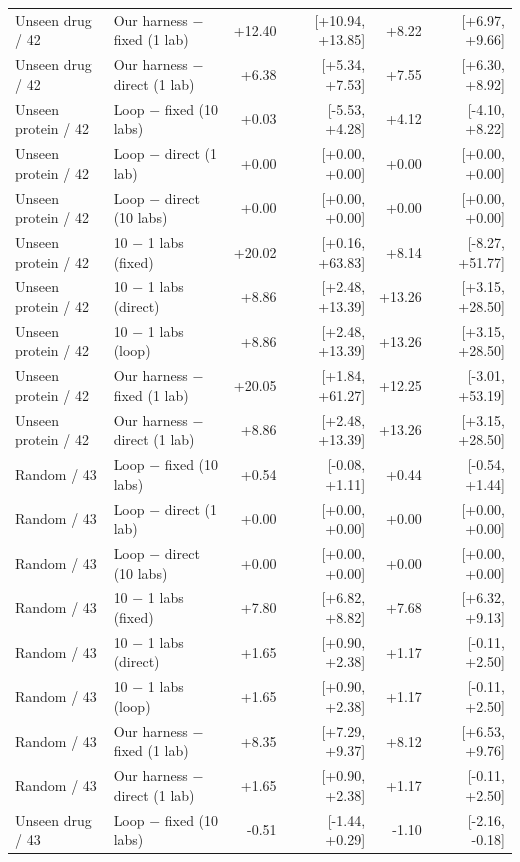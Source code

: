 \begin{longtable}{llrrrr}
Unseen drug / 42 & Our harness $-$ fixed (1 lab) & +12.40 & [+10.94, +13.85] & +8.22 & [+6.97, +9.66] \\
Unseen drug / 42 & Our harness $-$ direct (1 lab) & +6.38 & [+5.34, +7.53] & +7.55 & [+6.30, +8.92] \\
\midrule
Unseen protein / 42 & Loop $-$ fixed (10 labs) & +0.03 & [-5.53, +4.28] & +4.12 & [-4.10, +8.22] \\
Unseen protein / 42 & Loop $-$ direct (1 lab) & +0.00 & [+0.00, +0.00] & +0.00 & [+0.00, +0.00] \\
Unseen protein / 42 & Loop $-$ direct (10 labs) & +0.00 & [+0.00, +0.00] & +0.00 & [+0.00, +0.00] \\
Unseen protein / 42 & 10 $-$ 1 labs (fixed) & +20.02 & [+0.16, +63.83] & +8.14 & [-8.27, +51.77] \\
Unseen protein / 42 & 10 $-$ 1 labs (direct) & +8.86 & [+2.48, +13.39] & +13.26 & [+3.15, +28.50] \\
Unseen protein / 42 & 10 $-$ 1 labs (loop) & +8.86 & [+2.48, +13.39] & +13.26 & [+3.15, +28.50] \\
Unseen protein / 42 & Our harness $-$ fixed (1 lab) & +20.05 & [+1.84, +61.27] & +12.25 & [-3.01, +53.19] \\
Unseen protein / 42 & Our harness $-$ direct (1 lab) & +8.86 & [+2.48, +13.39] & +13.26 & [+3.15, +28.50] \\
\midrule
Random / 43 & Loop $-$ fixed (10 labs) & +0.54 & [-0.08, +1.11] & +0.44 & [-0.54, +1.44] \\
Random / 43 & Loop $-$ direct (1 lab) & +0.00 & [+0.00, +0.00] & +0.00 & [+0.00, +0.00] \\
Random / 43 & Loop $-$ direct (10 labs) & +0.00 & [+0.00, +0.00] & +0.00 & [+0.00, +0.00] \\
Random / 43 & 10 $-$ 1 labs (fixed) & +7.80 & [+6.82, +8.82] & +7.68 & [+6.32, +9.13] \\
Random / 43 & 10 $-$ 1 labs (direct) & +1.65 & [+0.90, +2.38] & +1.17 & [-0.11, +2.50] \\
Random / 43 & 10 $-$ 1 labs (loop) & +1.65 & [+0.90, +2.38] & +1.17 & [-0.11, +2.50] \\
Random / 43 & Our harness $-$ fixed (1 lab) & +8.35 & [+7.29, +9.37] & +8.12 & [+6.53, +9.76] \\
Random / 43 & Our harness $-$ direct (1 lab) & +1.65 & [+0.90, +2.38] & +1.17 & [-0.11, +2.50] \\
\midrule
Unseen drug / 43 & Loop $-$ fixed (10 labs) & -0.51 & [-1.44, +0.29] & -1.10 & [-2.16, -0.18] \\

\end{longtable}
